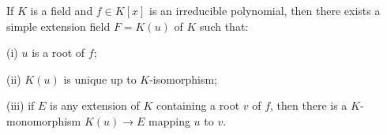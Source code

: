 If $K$ is a field and $f \in K[x]$ is an irreducible polynomial, then there exists a simple extension field $F = K(u)$ of $K$ such that:

(i) $u$ is a root of $f$;

(ii) $K(u)$ is unique up to $K$-isomorphism;

(iii) if $E$ is any extension of $K$ containing a root $v$ of $f$, then there is a $K$-monomorphism $K(u) \to E$ mapping $u$ to $v$.
